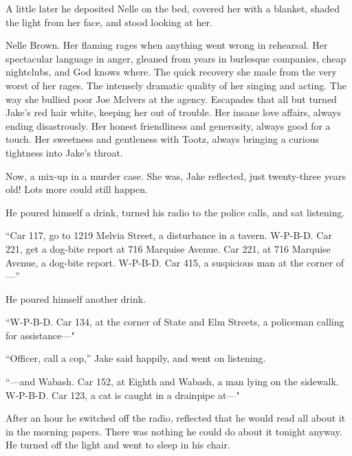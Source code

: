 \documentclass{novel}
\begin{document}
A little later he deposited Nelle on the bed, covered her with a blanket, shaded the light from her face, and stood looking at her.

Nelle Brown. Her flaming rages when anything went wrong in rehearsal. Her spectacular language in anger, gleaned from years in burlesque companies, cheap nightclubs, and God knows where. The quick recovery she made from the very worst of her rages. The intensely dramatic quality of her singing and acting. The way she bullied poor Joe Mclvers at the agency. Escapades that all but turned Jake’s red hair white, keeping her out of trouble. Her insane love affairs, always ending disastrously. Her honest friendliness and generosity, always good for a touch. Her sweetness and gentleness with Tootz, always bringing a curious tightness into Jake’s throat.

Now, a mix-up in a murder case. She was, Jake reflected, just twenty-three years old! Lots more could still happen.

He poured himself a drink, turned his radio to the police calls, and sat listening.

“Car 117, go to 1219 Melvia Street, a disturbance in a tavern. W-P-B-D. Car 221, get a dog-bite report at 716 Marquise Avenue. Car 221, at 716 Marquise Avenue, a dog-bite report. W-P-B-D. Car 415, a suspicious man at the corner of—”

He poured himself another drink.

“W-P-B-D. Car 134, at the corner of State and Elm Streets, a policeman calling for assistance—"

“Officer, call a cop,” Jake said happily, and went on listening.

“—and Wabash. Car 152, at Eighth and Wabash, a man lying on the sidewalk. W-P-B-D. Car 123, a cat is caught in a drainpipe at—"

After an hour he switched off the radio, reflected that he would read all about it in the morning papers. There was nothing he could do about it tonight anyway. He turned off the light and went to sleep in his chair.

\vspace{2\nbs}
\clearpage
\thispagestyle{empty}

\begin{ChapterStart}
\vspace{3\nbs}
\end{ChapterStart}
\end{document}
